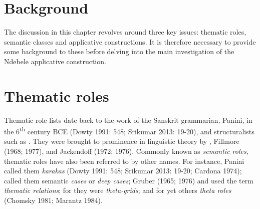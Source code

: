 \section{ Background}

The discussion in this chapter revolves around three key issues: thematic roles, semantic classes and applicative constructions. It is therefore necessary to provide some background to these before delving into the main investigation of the Ndebele applicative construction. 

\section{Thematic roles}

Thematic role lists date back to the work of the Sanskrit grammarian, Panini, in the 6\textsuperscript{th} century BCE (Dowty 1991: 548; Srikumar 2013: 19-20), and structuralists such as \citet{Blake1930}. They were brought to prominence in linguistic theory by \citet{Gruber1965}, Fillmore (1968; 1977), and Jackendoff (1972; 1976). Commonly known as \textit{semantic roles}, thematic roles have also been referred to by other names. For instance, Panini called them \textit{karakas }(Dowty 1991: 548; Srikumar 2013: 19-20; Cardona 1974); \citet{Fillmore1968} called them semantic \textit{cases} or \textit{deep cases}; Gruber (1965; 1976) and \citet{Jackendoff1972} used the term \textit{thematic relations}; for \citet{Stowell1981} they were \textit{theta-grids}; and for yet others \textit{theta roles} (Chomsky 1981; Marantz 1984).           

